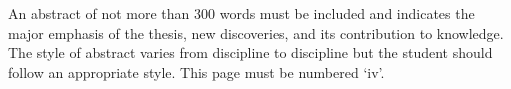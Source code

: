 \pagestyle{plain}


An abstract of not more than 300 words must be included and indicates the major emphasis of the thesis, new discoveries, and its contribution to knowledge. The style of abstract varies from discipline to discipline but the student should follow an appropriate style. This page must be numbered ‘iv’.
